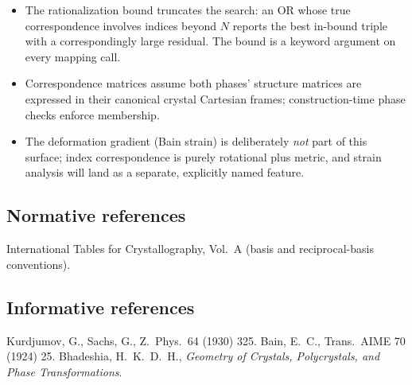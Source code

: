 \begin{itemize}
  \item The rationalization bound truncates the search: an OR whose true correspondence involves
        indices beyond $N$ reports the best in-bound triple with a correspondingly large
        residual. The bound is a keyword argument on every mapping call.
  \item Correspondence matrices assume both phases' structure matrices are expressed in their
        canonical crystal Cartesian frames; construction-time phase checks enforce membership.
  \item The deformation gradient (Bain strain) is deliberately \emph{not} part of this surface;
        index correspondence is purely rotational plus metric, and strain analysis will land as
        a separate, explicitly named feature.
\end{itemize}

\subsection*{Normative references}

International Tables for Crystallography, Vol.~A (basis and reciprocal-basis conventions).

\subsection*{Informative references}

Kurdjumov, G., Sachs, G., Z.~Phys.~64 (1930) 325.
Bain, E.~C., Trans.~AIME 70 (1924) 25.
Bhadeshia, H.~K.~D.~H., \emph{Geometry of Crystals, Polycrystals, and Phase Transformations}.
